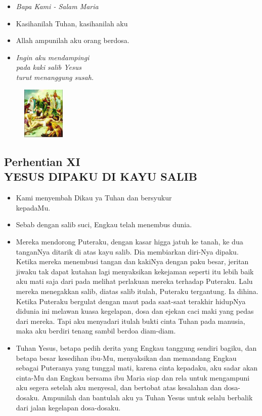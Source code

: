 \documentclass[a5paper,headsepline,titlepage,10pt,nnormalheadings,DIVcalc]{scrbook}
\newcommand{\BU}[1]{\begin{itemize} \item[U:] #1 \end{itemize}}
\newcommand{\BP}[1]{\begin{itemize} \item[P:] #1 \end{itemize}}
\begin{document}
\large\begin{itemize}\item[~]\it{Bapa Kami - Salam Maria}\end{itemize}\normalsize
\BP{Kasihanilah Tuhan, kasihanilah aku}
   \BU{Allah ampunilah aku orang berdosa.}

\begin{itemize}
\item[10.] \it{Ingin aku mendampingi\\ pada kaki salib
     Yesus\\ turut menanggung susah.
}\end{itemize}

\begin{figure}
\includegraphics[width=2cm]{jalansalib_files/11_small.jpg}
\end{figure}
\subsection*{Perhentian XI\\
YESUS DIPAKU DI KAYU SALIB}

\BP{   Kami menyembah Dikau ya Tuhan dan bersyukur\\kepadaMu.}
\BU{   Sebab dengan salib suci, Engkau telah menembus dunia. } 

\BP{Mereka  mendorong   Puteraku,    dengan   kasar   higga    jatuh   ke tanah,   ke dua tanganNya ditarik di atas kayu salib. Dia membiarkan diri-Nya dipaku. Ketika mereka menembusi tangan dan kakiNya dengan paku besar, jeritan jiwaku tak dapat kutahan lagi menyaksikan kekejaman seperti itu lebih baik aku mati saja dari pada melihat perlakuan mereka terhadap Puteraku. Lalu mereka menegakkan salib, diatas salib itulah, Puteraku tergantung. Ia dihina. Ketika Puteraku bergulat dengan maut pada saat-saat terakhir hidupNya didunia ini melawan kuasa kegelapan, dosa dan ejekan caci maki yang pedas dari mereka. Tapi aku menyadari itulah bukti cinta Tuhan pada manusia, maka aku berdiri tenang sambil berdoa diam-diam.}

\BU{ Tuhan Yesus, betapa pedih derita  yang  Engkau  tanggung  sendiri  bagiku,  dan betapa besar kesedihan ibu-Mu, menyaksikan dan memandang Engkau sebagai Puteranya yang tunggal mati, karena cinta kepadaku, aku sadar akan cinta-Mu dan Engkau bersama ibu Maria siap dan rela untuk mengampuni aku segera setelah aku menyesal, dan bertobat atas kesalahan dan dosa-dosaku. Ampunilah dan bantulah aku ya Tuhan Yesus untuk selalu berbalik dari jalan kegelapan dosa-dosaku.}
\end{document}
